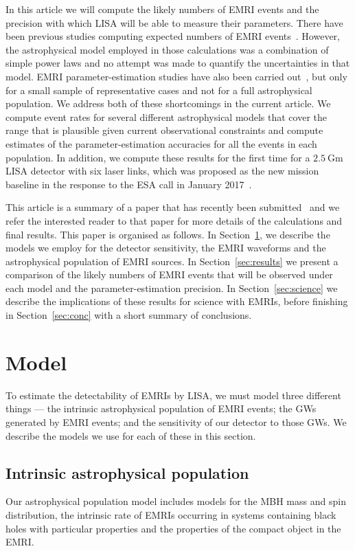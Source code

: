 \documentclass[a4paper]{jpconf}
\begin{document}
In this article we will compute the likely numbers of EMRI events and the precision with which LISA will be able to measure their parameters. There have been previous studies computing expected numbers of EMRI events~\cite{JG09}. However, the astrophysical model employed in those calculations was a combination of simple power laws and no attempt was made to quantify the uncertainties in that model. EMRI parameter-estimation studies have also been carried out~\cite{AK,EliuNK}, but only for a small sample of representative cases and not for a full astrophysical population. We address both of these shortcomings in the current article. We compute event rates for several different astrophysical models that cover the range that is plausible given current observational constraints and compute estimates of the parameter-estimation accuracies for all the events in each population. In addition, we compute these results for the first time for a $2.5~\mathrm{Gm}$ LISA detector with six laser links, which was proposed as the new mission baseline in the response to the ESA call in January 2017~\cite{L3missprop}.

This article is a summary of a paper that has recently been submitted~\cite{PRDPaper} and we refer the interested reader to that paper for more details of the calculations and final results. This paper is organised as follows. In Section~\ref{sec:model}, we describe the models we employ for the detector sensitivity, the EMRI waveforms and the astrophysical population of EMRI sources. In Section~\ref{sec:results} we present a comparison of the likely numbers of EMRI events that will be observed under each model and the parameter-estimation precision. In Section~\ref{sec:science} we describe the implications of these results for science with EMRIs, before finishing in Section~\ref{sec:conc} with a short summary of conclusions.

\section{Model}
\label{sec:model}
To estimate the detectability of EMRIs by LISA, we must model three different things --- the intrinsic astrophysical population of EMRI events; the GWs generated by EMRI events; and the sensitivity of our detector to those GWs. We describe the models we use for each of these in this section. 

\subsection{Intrinsic astrophysical population}
Our astrophysical population model includes models for the MBH mass and spin distribution, the intrinsic rate of EMRIs occurring in systems containing black holes with particular properties and the properties of the compact object in the EMRI.
\end{document}
